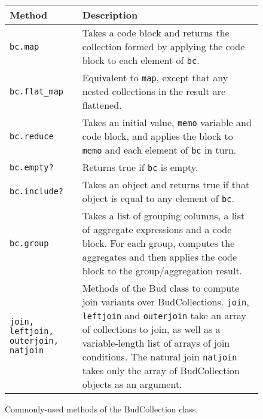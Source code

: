 \begin{figure}
	\begin{small}
	\begin{tabular}{|p{0.65in}|p{2.35in}|}
		\hline
		Method & Description\\
		\hline
		\texttt{bc.map} & Takes a code block and returns the collection formed by applying the code block to each element of \texttt{bc}.\\
		\texttt{bc.flat\_map} & Equivalent to \texttt{map}, except that any
        nested collections in the result are flattened.\\
		\texttt{bc.reduce} & Takes an initial value, \texttt{memo} variable and code block, and applies the block to \texttt{memo} and each element of \texttt{bc} in turn.\\
		\texttt{bc.empty?} & Returns true if \texttt{bc} is empty.\\
    \texttt{bc.include?} & Takes an object and returns true if that object is equal to any element of \texttt{bc}.\\
		\texttt{bc.group} & Takes a list of grouping columns, a list of
        aggregate expressions and a code block. For each group, computes the
        aggregates and then applies the code block to the group/aggregation result.\\
		\hline \hline
		\texttt{join, leftjoin, outerjoin, natjoin} & Methods of the Bud class
        to compute join variants over BudCollections.  \texttt{join},
        \texttt{leftjoin} and \texttt{outerjoin} take an array of collections to join, as well as a variable-length list of arrays of join conditions.  The natural join \texttt{natjoin} takes only the array of BudCollection objects as an argument.\\
		\hline
	\end{tabular}
\end{small}
\caption{Commonly-used methods of the BudCollection class.}
\label{tab:collmethods}
\end{figure}


